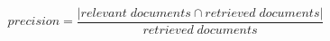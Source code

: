 \begin{equation}
  precision = \frac{|{relevant\;documents}\cap{retrieved\;documents}|}{{retrieved\;documents}}
\end{equation} 
